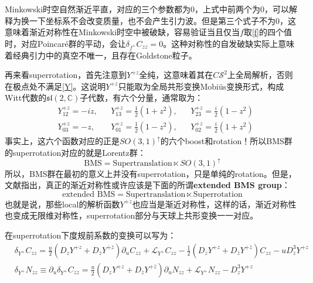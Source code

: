 Minkowski时空自然渐近平直，对应的三个参数都为0，上式中前两个为0，可以解释为换一下坐标系不会改变质量，也不会产生引力波。但是第三个式子不为0，这意味着渐近对称性在Minkowski时空中被破缺，容易验证当且仅当$f$取\ref{f}的四个值时，对应Poincar\'e群的平动，会让$\delta_{f^+} C_{zz}=0$。这种对称性的自发破缺实际上意味着经典引力中的真空不唯一，且存在Goldstone粒子\cite{Strominger:2017zoo}。

再来看superrotation，首先注意到$Y^{+z}$全纯，这意味着其在$C\mathcal{S}^2$上全局解析，否则在极点处不满足\ref{Y}。这说明$Y^{+z}$只能取为全局共形变换Mobi\"us变换形式，构成Witt代数的$\mathfrak{sl}(2,\mathbb{C})$子代数，有六个分量，通常取为：
\begin{align*}
	&Y^{+z}_{12}=-iz,&&Y^{+z}_{13}=\frac{1}{2}(1+z^2),&&Y^{+z}_{23}=\frac{i}{2}(1-z^2)\\
	&Y^{+z}_{03}=-z,&&Y^{+z}_{01}=\frac{1}{2}(1-z^2),&&Y^{+z}_{02}=\frac{i}{2}(1+z^2)
\end{align*}
事实上，这六个函数对应的正是$SO(3,1)^\uparrow$的六个boost和rotation！所以BMS群的superrotation对应的就是Lorentz群：
\begin{equation}
	\text{BMS}=\text{Supertranslation}\ltimes SO(3,1)^\uparrow
\end{equation}
所以，BMS群在最初的意义上并没有superrotation，只是单纯的rotation。但是，文献\cite{Barnich:2009se,Barnich:2010ojg,Barnich:2011mi,Banks:2003vp}指出，真正的渐近对称性或许应该是下面的所谓\textbf{extended BMS group}：
\begin{equation}
	\text{extended BMS} =\text{Supertranslation}\ltimes \text{Superrotation}
\end{equation}
也就是说，那些local的解析函数$Y^{+z}$也应当是渐近对称性，这样的话，渐近对称性也变成无限维对称性，superrotation部分与天球上共形变换一一对应。

在superrotation下度规前系数的变换可以写为：
\begin{equation}
	\begin{aligned}
		&\delta_{Y^+}C_{zz}=\frac{u}{2}\left(D_zY^{+z}+D_{\bar z}Y^{+\bar z} \right)\partial_u C_{zz}+\mathcal{L}_{Y^+}C_{zz}-\frac{1}{2}\left(D_zY^{+z}+D_{\bar z}Y^{+\bar z}\right)C_{zz}-uD^3_{z}Y^{+z}\\
		&\delta_{Y^+}N_{zz}\equiv\partial_u\delta_{Y^+}C_{zz}=\frac{u}{2}\left(D_zY^{+z}+D_{\bar z}Y^{+\bar z} \right)\partial_u N_{zz}+\mathcal{L}_{Y^+}N_{zz}-D^3_zY^{+z}
	\end{aligned}
\end{equation}


